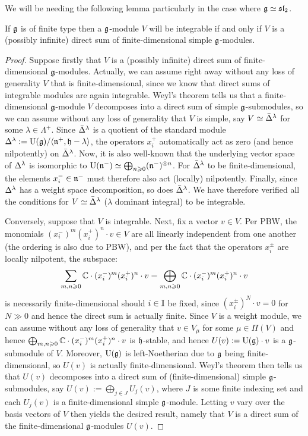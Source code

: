         We will be needing the following lemma particularly in the case where $\mathfrak{g} \simeq \mathfrak{sl}_2$.
        \begin{lemma} \label{lemma: finite_type_integrability}
            If $\mathfrak{g}$ is of finite type then a $\mathfrak{g}$-module $V$ will be integrable if and only if $V$ is a (possibly infinite) direct sum of finite-dimensional simple $\mathfrak{g}$-modules.
        \end{lemma}
            \begin{proof}
                Suppose firstly that $V$ is a (possibly infinite) direct sum of finite-dimensional $\mathfrak{g}$-modules. Actually, we can assume right away without any loss of generality $V$ that is finite-dimensional, since we know that direct sums of integrable modules are again integrable. Weyl's theorem tells us that a finite-dimensional $\mathfrak{g}$-module $V$ decomposes into a direct sum of simple $\mathfrak{g}$-submodules, so we can assume without any loss of generality that $V$ is simple, say $V \simeq \bar{\Delta}^{\lambda}$ for some $\lambda \in \Lambda^+$. Since $\bar{\Delta}^{\lambda}$ is a quotient of the standard module $\Delta^{\lambda} := \mathrm{U}(\mathfrak{g})/\langle\mathfrak{n}^+, \mathfrak{h} - \lambda\rangle$, the operators $x_i^+$ automatically act as zero (and hence nilpotently) on $\bar{\Delta}^{\lambda}$. Now, it is also well-known that the underlying vector space of $\Delta^{\lambda}$ is isomorphic to $\rmU(\n^-) \cong \bigoplus_{n \geq 0} (\n^-)^{\tensor n}$. For $\bar{\Delta}^{\lambda}$ to be finite-dimensional, the elements $x_i^- \in \mathfrak{n}^-$ must therefore also act (locally) nilpotently. Finally, since $\Delta^{\lambda}$ has a weight space decomposition, so does $\bar{\Delta}^{\lambda}$. We have therefore verified all the conditions for $V \simeq \bar{\Delta}^{\lambda}$ ($\lambda$ dominant integral) to be integrable. 

                Conversely, suppose that $V$ is integrable. Next, fix a vector $v \in V$. Per PBW, the monomials $(x_i^-)^m (x_i^+)^n \cdot v \in V$ are all linearly independent from one another (the ordering is also due to PBW), and per the fact that the operators $x_i^{\pm}$ are locally nilpotent, the subspace:
                    $$\sum_{m, n \geqslant 0} \mathbb{C} \cdot (x_i^-)^m (x_i^+)^n \cdot v = \bigoplus_{m, n \geqslant 0} \mathbb{C} \cdot (x_i^-)^m (x_i^+)^n \cdot v$$
                is necessarily finite-dimensional should $i \in \mathbb{I}$ be fixed, since $(x_i^{\pm})^N \cdot v = 0$ for $N \gg 0$ and hence the direct sum is actually finite. Since $V$ is a weight module, we can assume without any loss of generality that $v \in V_{\mu}$ for some $\mu \in \Pi(V)$ and hence $\bigoplus_{m, n \geqslant 0} \mathbb{C} \cdot (x_i^-)^m (x_i^+)^n \cdot v$ is $\mathfrak{h}$-stable, and hence $U(v) := \mathrm{U}(\mathfrak{g}) \cdot v$ is a $\mathfrak{g}$-submodule of $V$. Moreover, $\mathrm{U}(\mathfrak{g})$ is left-Noetherian due to $\mathfrak{g}$ being finite-dimensional, so $U(v)$ is actually finite-dimensional. Weyl's theorem then tells us that $U(v)$ decomposes into a direct sum of (finite-dimensional) simple $\mathfrak{g}$-submodules, say $U(v) := \bigoplus_{j \in J} U_j(v)$, where $J$ is some finite indexing set and each $U_j(v)$ is a finite-dimensional simple $\mathfrak{g}$-module. Letting $v$ vary over the basis vectors of $V$ then yields the desired result, namely that $V$ is a direct sum of the finite-dimensional $\mathfrak{g}$-modules $U(v)$. 
            \end{proof}
